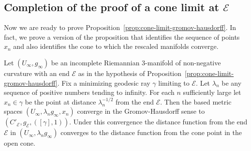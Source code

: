 \subsection{Completion of the proof of a cone limit at ${\mathcal E}$}

Now we are ready to prove Proposition~\ref{prop:cone-limit-gromov-hausdorff}. In fact, we
prove a version of the proposition that identifies the sequence of
points $x_n$ and also identifies the cone to which the
rescaled manifolds converge.

\begin{proposition}
\label{prop:gromov-hausdorff-limit-is-cone}
\label{secondstatment}
Let $(U_\infty,g_\infty)$  be an incomplete Riemannian $3$-manifold
of non-negative curvature with an end ${\mathcal E}$ as in the
hypothesis of Proposition~\ref{prop:cone-limit-gromov-hausdorff}. Fix a minimizing geodesic
ray $\gamma$ limiting to ${\mathcal E}$. Let $\lambda_n$ be any
sequence of positive numbers tending to infinity. For each $n$
sufficiently large let $x_n\in \gamma$ be the point at distance
$\lambda_n^{-1/2}$ from the end ${\mathcal E}$. Then the based
metric spaces $(U_\infty,\lambda_ng_\infty,x_n)$ converge in the
Gromov-Hausdorff sense to
$\left( C'_{\mathcal E},g_{\mathcal E},([\gamma],1)\right)$. Under
this convergence the distance function from the end ${\mathcal E}$
in $(U_\infty,\lambda_ng_\infty)$ converges to the distance function
from the cone point in the open cone.
\end{proposition}


